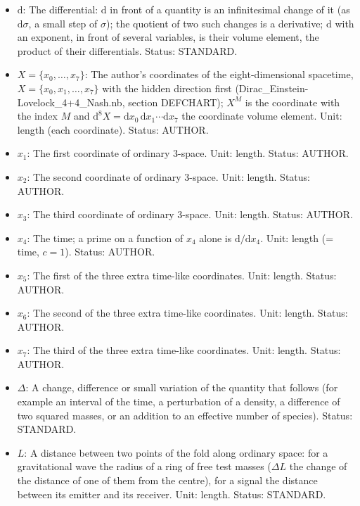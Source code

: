 \documentclass[
  10pt,
]{article}
\begin{document}
\begin{itemize}
  index is summed. Status: STANDARD.
\item
  \(\mathrm{d}\): The differential: \(\mathrm{d}\) in front of a
  quantity is an infinitesimal change of it (as \(\mathrm{d}\sigma\), a
  small step of \(\sigma\)); the quotient of two such changes is a
  derivative; \(\mathrm{d}\) with an exponent, in front of several
  variables, is their volume element, the product of their
  differentials. Status: STANDARD.
\item
  \(X = \{x_0, \dots, x_7\}\): The author's coordinates of the
  eight-dimensional spacetime, \(X = \{x_0, x_1, \dots, x_7\}\) with the
  hidden direction first (Dirac\_Einstein-Lovelock\_4+4\_Nash.nb,
  section DEFCHART); \(X^M\) is the coordinate with the index \(M\) and
  \(\mathrm{d}^8X = \mathrm{d}x_0\,\mathrm{d}x_1\cdots\mathrm{d}x_7\)
  the coordinate volume element. Unit: length (each coordinate). Status:
  AUTHOR.
\item
  \(x_1\): The first coordinate of ordinary 3-space. Unit: length.
  Status: AUTHOR.
\item
  \(x_2\): The second coordinate of ordinary 3-space. Unit: length.
  Status: AUTHOR.
\item
  \(x_3\): The third coordinate of ordinary 3-space. Unit: length.
  Status: AUTHOR.
\item
  \(x_4\): The time; a prime on a function of \(x_4\) alone is
  \(\mathrm{d}/\mathrm{d}x_4\). Unit: length (= time, \(c = 1\)).
  Status: AUTHOR.
\item
  \(x_5\): The first of the three extra time-like coordinates. Unit:
  length. Status: AUTHOR.
\item
  \(x_6\): The second of the three extra time-like coordinates. Unit:
  length. Status: AUTHOR.
\item
  \(x_7\): The third of the three extra time-like coordinates. Unit:
  length. Status: AUTHOR.
\item
  \(\Delta\): A change, difference or small variation of the quantity
  that follows (for example an interval of the time, a perturbation of a
  density, a difference of two squared masses, or an addition to an
  effective number of species). Status: STANDARD.
\item
  \(L\): A distance between two points of the fold along ordinary space:
  for a gravitational wave the radius of a ring of free test masses
  (\(\Delta L\) the change of the distance of one of them from the
  centre), for a signal the distance between its emitter and its
  receiver. Unit: length. Status: STANDARD.
\end{itemize}
\end{document}
